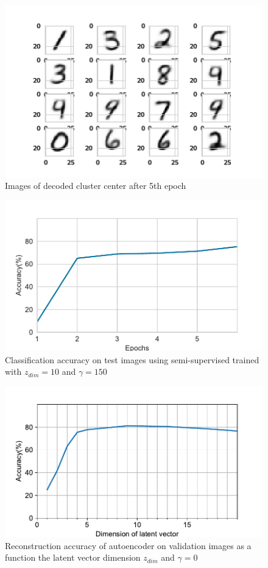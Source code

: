 \documentclass{uai2021} %
\begin{document}
\begin{figure}[]
\centering
\includegraphics[width=\linewidth]{cluster_centers_epoch_6.0}
\caption{Images of decoded cluster center after 5th epoch}
\label{cluster_center_6}
\end{figure}

\begin{figure}[]
\centering
\includegraphics[width=\linewidth]{classification_accuracy}
\caption{Classification accuracy on test images using semi-supervised trained with $z_{dim}=10$ and $\gamma = 150$}
\label{classification_accuracy}
\end{figure}

\begin{figure}[]
\centering
\includegraphics[width=\linewidth]{reconstruction_accuracy}
\caption{Reconstruction accuracy of autoencoder on validation images as a function the latent vector dimension  $z_{dim}$ and $\gamma = 0$}
\label{reconstruction_accuracy}
\end{figure}
\end{document}
